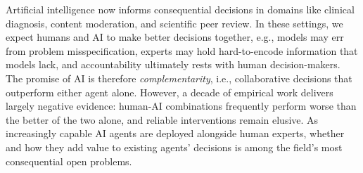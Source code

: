 \setlength{\columnsep}{15pt}
\setlength{\intextsep}{0pt plus 0pt minus 0pt}
\setlength{\parindent}{\myindent}
\setlength{\parskip}{\myparskip}
\vspace*{-20pt}



\setlength{\columnsep}{15pt}%
\setlength{\intextsep}{0pt plus 0pt minus 0pt}

\setlength{\parindent}{\myindent}
\setlength{\parskip}{\myparskip}


Artificial intelligence now informs consequential decisions in domains like clinical diagnosis, content moderation, and scientific peer review.
In these settings, we expect humans and AI to make better decisions together, e.g., models may err from problem misspecification, experts may hold hard-to-encode information that models lack, and accountability ultimately rests with human decision-makers. 
The promise of AI is therefore \emph{complementarity}, i.e., collaborative decisions that outperform either agent alone.
However, a decade of empirical work delivers largely negative evidence: human-AI combinations frequently perform worse than the better of the two alone, and reliable interventions remain elusive.
As increasingly capable AI agents are deployed alongside human experts, whether and how they add value to existing agents' decisions is among the field's most consequential open problems.


